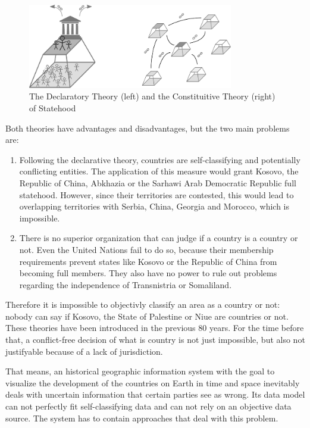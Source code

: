 \begin{figure}[ht]
  \centering
  \includegraphics[width = 0.8\textwidth]{graphics/uncertainty/decl_const_theory}
  \caption{The Declaratory Theory (left) and the Constituitive Theory (right) of Statehood}
  \label{fig:declaratory_constituitive_theory}
\end{figure}

Both theories have advantages and disadvantages, but the two main problems are:
\begin{enumerate}
  \item Following the declarative theory, countries are self-classifying and potentially conflicting entities. The application of this measure would grant Kosovo, the Republic of China, Abkhazia or the Sarhawi Arab Democratic Republic full statehood. However, since their territories are contested, this would lead to overlapping territories with Serbia, China, Georgia and Morocco, which is impossible.
  \item There is no superior organization that can judge if a country is a country or not. Even the United Nations fail to do so, because their membership requirements prevent states like Kosovo or the Republic of China from becoming full members. They also have no power to rule out problems regarding the independence of Transnistria or Somaliland.
\end{enumerate}

Therefore it is impossible to objectivly classify an area as a country or not: nobody can say if Kosovo, the State of Palestine or Niue are countries or not. These theories have been introduced in the previous 80 years. For the time before that, a conflict-free decision of what is country is not just impossible, but also not justifyable because of a lack of jurisdiction.

That means, an historical geographic information system with the goal to visualize the development of the countries on Earth in time and space inevitably deals with uncertain information that certain parties see as wrong. Its data model can not perfectly fit self-classifying data and can not rely on an objective data source. The system has to contain approaches that deal with this problem.

